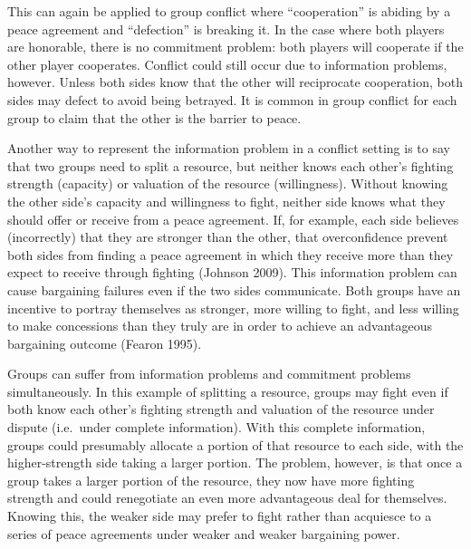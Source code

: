 \documentclass[11pt]{article}
\begin{document}
This can again be applied to group conflict where ``cooperation'' is
abiding by a peace agreement and ``defection'' is breaking it. In the
case where both players are honorable, there is no commitment problem:
both players will cooperate if the other player cooperates. Conflict
could still occur due to information problems, however. Unless both
sides know that the other will reciprocate cooperation, both sides may
defect to avoid being betrayed. It is common in group conflict for each
group to claim that the other is the barrier to peace.

Another way to represent the information problem in a conflict setting
is to say that two groups need to split a resource, but neither knows
each other's fighting strength (capacity) or valuation of the resource
(willingness). Without knowing the other side's capacity and willingness
to fight, neither side knows what they should offer or receive from a
peace agreement. If, for example, each side believes (incorrectly) that
they are stronger than the other, that overconfidence prevent both sides
from finding a peace agreement in which they receive more than they
expect to receive through fighting (Johnson 2009). This information
problem can cause bargaining failures even if the two sides communicate.
Both groups have an incentive to portray themselves as stronger, more
willing to fight, and less willing to make concessions than they truly
are in order to achieve an advantageous bargaining outcome (Fearon
1995).

Groups can suffer from information problems and commitment problems
simultaneously. In this example of splitting a resource, groups may
fight even if both know each other's fighting strength and valuation of
the resource under dispute (i.e.~under complete information). With this
complete information, groups could presumably allocate a portion of that
resource to each side, with the higher-strength side taking a larger
portion. The problem, however, is that once a group takes a larger
portion of the resource, they now have more fighting strength and could
renegotiate an even more advantageous deal for themselves. Knowing this,
the weaker side may prefer to fight rather than acquiesce to a series of
peace agreements under weaker and weaker bargaining power.
\end{document}
